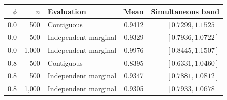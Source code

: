 \begin{tabular}{rrlrr}
\toprule
$\phi$ & $n$ & Evaluation & Mean & Simultaneous band \\
\midrule
0.0 & 500 & Contiguous & 0.9412 & $[0.7299, 1.1525]$ \\
0.0 & 500 & Independent marginal & 0.9329 & $[0.7936, 1.0722]$ \\
0.0 & 1{,}000 & Independent marginal & 0.9976 & $[0.8445, 1.1507]$ \\
0.8 & 500 & Contiguous & 0.8395 & $[0.6331, 1.0460]$ \\
0.8 & 500 & Independent marginal & 0.9347 & $[0.7881, 1.0812]$ \\
0.8 & 1{,}000 & Independent marginal & 0.9305 & $[0.7933, 1.0678]$ \\
\bottomrule
\end{tabular}
